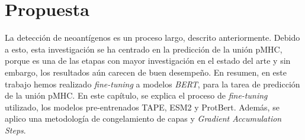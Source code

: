 \chapter{Propuesta}
\label{cap:propuesta}




La detección de neoantígenos es un proceso largo, descrito anteriormente. Debido a esto, esta investigación se ha centrado en la predicción de la unión pMHC, porque es una de las etapas con mayor investigación en el estado del arte y sin embargo, los resultados aún carecen de buen desempeño. En resumen, en este trabajo hemos realizado \textit{fine-tuning} a modelos \textit{BERT}, para la tarea de predicción de la unión pMHC. En este capítulo, se explica el proceso de \textit{fine-tuning} utilizado, los modelos pre-entrenados TAPE, ESM2 y ProtBert. Además, se aplico una metodología de congelamiento de capas y \textit{Gradient Accumulation Steps}. 




